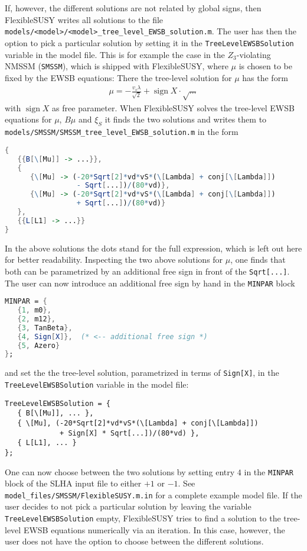 \documentclass[final,3p,11pt,pdflatex]{elsarticle}
\makeatletter
\newcommand{\fs}{FlexibleSUSY\@\xspace}
\newcommand{\code}[1]{\lstinline|#1|}  %
\DeclareMathOperator{\sign}{sign}
\makeatother
\begin{document}
If, however, the different solutions are not related by global signs,
then \fs writes all solutions to the file
\code{models/<model>/<model>_tree_level_EWSB_solution.m}.  The user
has then the option to pick a particular solution by setting it in the
\code{TreeLevelEWSBSolution} variable in the model file.  This is for
example the case in the $Z_3$-violating NMSSM (\code{SMSSM}), which is shipped with \fs, where
$\mu$ is chosen to be fixed by the EWSB equations: There the
tree-level solution for $\mu$ has the form
%
\begin{align}
  \mu = -\frac{v_s \lambda}{\sqrt{2}} + \sign X \cdot \sqrt{\ldots}
\end{align}
%
with $\sign X$ as free parameter.  When \fs solves the tree-level EWSB
equations for $\mu$, $B\mu$ and $\xi_S$ it finds the two solutions and
writes them to \code{models/SMSSM/SMSSM_tree_level_EWSB_solution.m} in
the form
%
\begin{lstlisting}[language=Mathematica]
{
   {{B[\[Mu]] -> ...}},
   {
      {\[Mu] -> (-20*Sqrt[2]*vd*vS*(\[Lambda] + conj[\[Lambda]])
                 - Sqrt[...])/(80*vd)},
      {\[Mu] -> (-20*Sqrt[2]*vd*vS*(\[Lambda] + conj[\[Lambda]])
                 + Sqrt[...])/(80*vd)}
   },
   {{L[L1] -> ...}}
}
\end{lstlisting}
%
In the above solutions the dots stand for the full expression, which
is left out here for better readability.  Inspecting the two above
solutions for $\mu$, one finds that both can be parametrized by an
additional free sign in front of the \code{Sqrt[...]}.  The user can
now introduce an additional free sign by hand in the \code{MINPAR}
block
%
\begin{lstlisting}[language=Mathematica]
MINPAR = {
   {1, m0},
   {2, m12},
   {3, TanBeta},
   {4, Sign[X]},  (* <-- additional free sign *)
   {5, Azero}
};
\end{lstlisting}
%
and set the the tree-level solution, parametrized in terms of
\code{Sign[X]}, in the \code{TreeLevelEWSBSolution} variable in
the model file:
%
\begin{lstlisting}
TreeLevelEWSBSolution = {
   { B[\[Mu]], ... },
   { \[Mu], (-20*Sqrt[2]*vd*vS*(\[Lambda] + conj[\[Lambda]])
             + Sign[X] * Sqrt[...])/(80*vd) },
   { L[L1], ... }
};
\end{lstlisting}
%
One can now choose between the two solutions by setting entry $4$ in
the \code{MINPAR} block of the SLHA input file to either $+1$ or $-1$.
See \code{model_files/SMSSM/FlexibleSUSY.m.in} for a complete example
model file.  If the user decides to not pick a particular solution by
leaving the variable \code{TreeLevelEWSBSolution} empty, \fs tries to
find a solution to the tree-level EWSB equations numerically via an
iteration.  In this case, however, the user does not have the option
to choose between the different solutions.
\end{document}
